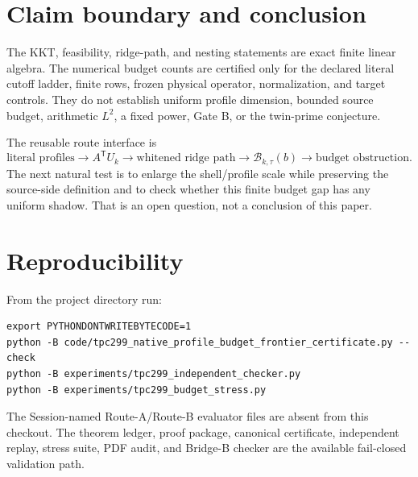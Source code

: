 \documentclass[10pt]{article}
\newcommand{\B}{\mathcal B}
\begin{document}
\section{Claim boundary and conclusion}

The KKT, feasibility, ridge-path, and nesting statements are exact finite
linear algebra.  The numerical budget counts are certified only for the
declared literal cutoff ladder, finite rows, frozen physical operator,
normalization, and target controls.  They do not establish uniform profile
dimension, bounded source budget, arithmetic $L^2$, a fixed power, Gate B,
or the twin-prime conjecture.

The reusable route interface is
\[
 \text{literal profiles}
 \longrightarrow A^{\mathsf T}U_k
 \longrightarrow \text{whitened ridge path}
 \longrightarrow \B_{k,\tau}(b)
 \longrightarrow \text{budget obstruction}.
 \]
The next natural test is to enlarge the shell/profile scale while preserving
the source-side definition and to check whether this finite budget gap has
any uniform shadow.  That is an open question, not a conclusion of this
paper.

\section*{Reproducibility}

From the project directory run:
\begin{verbatim}
export PYTHONDONTWRITEBYTECODE=1
python -B code/tpc299_native_profile_budget_frontier_certificate.py --check
python -B experiments/tpc299_independent_checker.py
python -B experiments/tpc299_budget_stress.py
\end{verbatim}
The Session-named Route-A/Route-B evaluator files are absent from this
checkout.  The theorem ledger, proof package, canonical certificate,
independent replay, stress suite, PDF audit, and Bridge-B checker are the
available fail-closed validation path.

\enlargethispage{2\baselineskip}
\small


\end{document}
